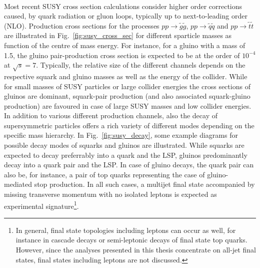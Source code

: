 \\
Most recent SUSY cross section calculations consider higher order corrections caused, \eg by quark radiation or gluon loops, typically up to next-to-leading order (NLO). Production cross sections for the processes $pp \rightarrow \tilde{g}\tilde{g}$, $pp \rightarrow \tilde{q}\tilde{q}$ and $pp \rightarrow \tilde{t}\tilde{t}$ are illustrated in Fig.~\ref{fig:susy_cross_sec} for different sparticle masses as function of the centre of mass energy. For instance, for a gluino with a mass of 1.5\tev, the gluino pair-production cross section is expected to be at the order of $10^{-4}$\pb at $\sqrt{s} = 7$\tev. Typically, the relative size of the different channels depends on the respective squark and gluino masses as well as the energy of the collider. While for small masses of SUSY particles or large collider energies the cross sections of gluinos are dominant, squark-pair production (and also associated squark-gluino production) are favoured in case of large SUSY masses and low collider energies. \\
In addition to various different production channels, also the decay of supersymmetric particles offers a rich variety of different modes depending on the specific mass hierarchy. In Fig.~\ref{fig:susy_decay}, some example diagrams for possible decay modes of squarks and gluinos are illustrated. While squarks are expected to decay preferrably into a quark and the LSP, gluinos predominantly decay into a quark pair and the LSP. In case of gluino decays, the quark pair can also be, for instance, a pair of top quarks representing the case of gluino-mediated stop production. In all such cases, a multijet final state accompanied by missing transverse momentum with no isolated leptons is expected as experimental signature\footnote{In general, final state topologies including leptons can occur as well, for instance in cascade decays or semi-leptonic decays of final state top quarks. However, since the analyses presented in this thesis concentrate on all-jet final states, final states including leptons are not discussed.}.  
